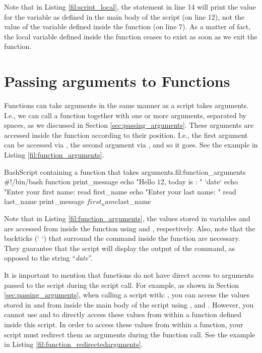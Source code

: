 Note that in Listing \ref{fil:script_local}, the  statement in line 14 will print the value for the variable  as defined in the main body of the script (on line 12), not the value of the variable  defined inside the function (on line 7). As a matter of fact, the local variable  defined inside the function ceases to exist as soon as we exit the function.


\section{Passing arguments to Functions}
Functions can take arguments in the same manner as a script takes arguments. I.e.,  we can call a function together with one or more arguments, separated by spaces, as we discussed in Section \ref{sec:passing_arguments}. These arguments are accessed inside the function according to their position. I.e., the first argument can be accessed via , the second argument via , and so it goes. See the example in Listing \ref{fil:function_arguments}.

\begin{source_code_float}{Bash}{Script containing a function that takes arguments.}{fil:function_arguments}
#!/bin/bash
function print_message {
    echo "Hello $1 $2,  today is : " `date`
}
echo "Enter your first name: 
read first_name
echo "Enter your last name: "
read last_name
print_message $first_name $last_name 
\end{source_code_float}
Note that in Listing \ref{fil:function_arguments}, the values stored in variables  and  are accessed from inside the function using  and , respectively. Also, note that the backticks (` `) that surround the  command inside the function are necessary. They guarantee that the script will display the output of the  command, as opposed to the string ``\textit{date}''.

It is important to mention that functions do not have direct access to arguments passed to the script during the script call. For example, as shown in Section \ref{sec:passing_arguments}, when calling a script with: , you can access the values stored in  and  from inside the main body of the script using , and . However, you cannot use  and  to directly access these values from within a function defined inside this script. In order to access these values from within a function, your script must redirect them as arguments during the function call. See the example in Listing \ref{fil:function_redirectedarguments}.
 
